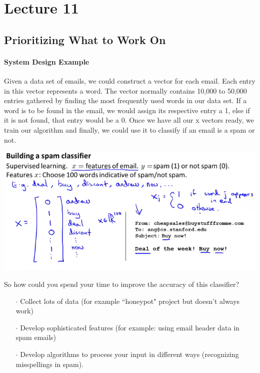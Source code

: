 \documentclass[UTF8]{article}
\begin{document}
\newpage

\section{Lecture 11}

\subsection{Prioritizing What to Work On}

\paragraph{System Design Example}

Given a data set of emails, we could construct a vector for each email. Each entry in this vector represents a word. The vector normally contains 10,000 to 50,000 entries gathered by finding the most frequently used words in our data set. If a word is to be found in the email, we would assign its respective entry a 1, else if it is not found, that entry would be a 0. Once we have all our x vectors ready, we train our algorithm and finally, we could use it to classify if an email is a spam or not.

\includegraphics[width = \textwidth]{NotePics/11_1_1.png}

So how could you spend your time to improve the accuracy of this classifier?

\begin{itemize}
\item[$\cdot$]Collect lots of data (for example ``honeypot" project but doesn't always work)
\item[$\cdot$]Develop sophisticated features (for example: using email header data in spam emails)
\item[$\cdot$]Develop algorithms to process your input in different ways (recognizing misspellings in spam).
\end{itemize}
\end{document}
